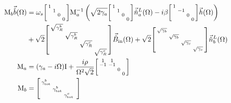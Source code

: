 \begin{align}
\mathrm{M}_b\vec{\hat{b}}(\Omega)&= \omega_s\begin{bsmallmatrix}
1 &  &  &  \\
 & 1 &  &  \\
 &  & 0 &  \\
 &  &  & 0
\end{bsmallmatrix}\mathrm{M}_a^{-1}\left(\sqrt{2\gamma_a}\begin{bsmallmatrix}
1 &  &  &  \\
 & 1 &  &  \\
 &  & 0 &  \\
 &  &  & 0
\end{bsmallmatrix}\vec{\hat{n}}^L_a(\Omega)-i\beta\begin{bsmallmatrix}
1 &  &  &  \\
 & -1 &  &  \\
 &  & 0 &  \\
 &  &  & 0
\end{bsmallmatrix}\vec{h}(\Omega)\right)\\&+ \sqrt{2}\begin{bsmallmatrix}
\sqrt{\gamma^b_R} &  &  &  \\
 & \sqrt{\gamma^b_R} &  &  \\
 &  & \sqrt{\gamma^c_R} &  \\
 &  &  & \sqrt{\gamma^c_R}
\end{bsmallmatrix}\vec{\hat B}_\mathrm{in}(\Omega) + \sqrt{2}\begin{bsmallmatrix}
\sqrt{\gamma_b} &  &  &  \\
 & \sqrt{\gamma_b} &  &  \\
 &  & \sqrt{\gamma_c} &  \\
 &  &  & \sqrt{\gamma_c}
\end{bsmallmatrix}\vec{\hat n}^L_b(\Omega)\\
\mathrm{M}_a &= (\gamma_a-i\Omega)\mathrm{I}+\frac{i\rho}{\Omega^2 \sqrt{2}}\begin{bsmallmatrix}
1 & 1 &  &  \\
-1 & -1 &  &  \\
 &  & 0 &  \\
 &  &  & 0
\end{bsmallmatrix}\\
\text{M}_b&=\begin{bsmallmatrix}
\gamma^b_\mathrm{tot} &  &  &  \\
 & \gamma^b_\mathrm{tot} &  &  \\
 &  & \gamma^c_\mathrm{tot} &  \\

\end{bsmallmatrix}
\end{align}
